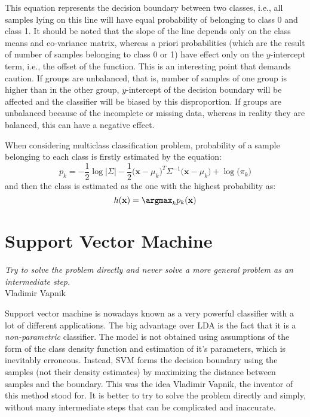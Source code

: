 \begin{appendix}
This equation represents the decision boundary between two classes, i.e., all samples lying on this line will have equal probability of belonging to class 0 and class 1. It should be noted that the slope of the line depends only on the class means and co-variance matrix, whereas a priori probabilities (which are the result of number of samples belonging to class 0 or 1) have effect only on the $y$-intercept term, i.e., the offset of the function. This is an interesting point that demands caution. If groups are unbalanced, that is, number of samples of one group is higher than in the other group, $y$-intercept of the decision boundary will be affected and the classifier will be biased by this disproportion. If groups are unbalanced because of the incomplete or missing data, whereas in reality they are balanced, this can have a negative effect.

When considering multiclass classification problem, probability of a sample belonging to each class is firstly estimated by the equation:
\begin{equation}
p_k = -\frac{1}{2} \log \big\vert \Sigma \big\vert - \frac{1}{2}  \Big(\mathbf{x}-\mu_k\Big)^T  \Sigma^{-1} \Big(\mathbf{x}-\mu_k\Big) +  \log{\Big(\pi_k\Big)}
\end{equation}
\noindent and then the class is estimated as the one with the highest probability as:
\begin{equation} 
h(\mathbf{x}) = \argmax_k p_k(\mathbf{x})
\end{equation}


\section{Support Vector Machine}

\begin{myquote}
\begin{flushright}
\textit{Try to solve the problem directly and never solve a more general problem as an intermediate step.} \\Vladimir Vapnik
\end{flushright}
\end{myquote}


Support vector machine is nowadays known as a very powerful classifier with a lot of different applications. The big advantage over LDA is the fact that it is a \emph{non-parametric} classifier. The model is not obtained using assumptions of the form of the class density function and estimation of it's parameters, which is inevitably erroneous. Instead, SVM forms the decision boundary using the samples (not their density estimates) by maximizing the distance between samples and the boundary.
This was the idea Vladimir Vapnik, the inventor of this method stood for. It is better to try to solve the problem directly and simply, without many intermediate steps that can be complicated and inaccurate.


\end{appendix}
